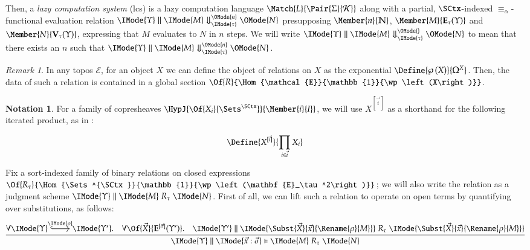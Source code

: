 \documentclass[11pt]{article}
\theoremstyle{definition}
\theoremstyle{notation}
\newtheorem*{notation*}{Notation}
\theoremstyle{remark}
\newtheorem{remark}[thm]{Remark}
\numberwithin{equation}{section}
\newcommand\Pow[1]{\wp\left(#1\right)}
\newcommand\EvalN[5]{\IMode{#1}\parallel\IMode{#4}\Downarrow^{\OMode{#3}}_{\IMode{#2}}\OMode{#5}}
\newcommand\Eval[4]{\EvalN{#1}{#2}{}{#3}{#4}}
\newcommand\Exprs{\mathbf{E}}
\newcommand\Values{\mathbf{V}}
\newcommand\Naturals{\mathbb{N}}
\begin{document}
Then, a \emph{lazy computation system} (lcs) is a lazy computation language
$\Match{L}{\Pair{\Sigma}{\CanOperators}}$ along with a partial, $\SCtx$-indexed
$\equiv_\alpha$-functional evaluation relation
$\EvalN{\Upsilon}{\tau}{n}{M}{N}$ presupposing $\Member{n}{\Naturals}$,
$\Member{M}{\Exprs_\tau(\Upsilon)}$ and $\Member{N}{\Values_\tau(\Upsilon)}$,
expressing that $M$ evaluates to $N$ in $n$ steps.  We will write
$\Eval{\Upsilon}{\tau}{M}{N}$ to mean that there exists an $n$ such that
$\EvalN{\Upsilon}{\tau}{n}{M}{N}$.

\begin{remark}
  In any topos $\mathcal{E}$, for an object $X$ we can define the object of
  relations on $X$ as the exponential $\Define{\Pow{X}}{\Omega^X}$. Then, the
  data of such a relation is contained in a global section
  $\Of{R}{\Hom{\mathcal{E}}{\mathbb{1}}{\Pow{X}}}$.
\end{remark}

\newcommand\SBinRel[4]{\IMode{#2}\parallel\IMode{#3}\mathrel{#1}\IMode{#4}}
\newcommand\OSBinRel[5]{\IMode{#2}\parallel\IMode{#3}\vDash\IMode{#4}\mathrel{#1}\IMode{#5}}

\begin{notation*}
  For a family of copresheaves $\HypJ{\Of{X_i}{\Sets^\SCtx}}{\Member{i}{I}}$, we will
  use $X^{[\vec{i}]}$ as a shorthand for the following iterated product, as
  in \cite{sterling-morrison:2015}:

  \[
    \Define{
      X^{[\vec{i}]}
    }{
      \prod_{i\in\vec{i}}
        X_i
    }
  \]
\end{notation*}

Fix a sort-indexed family of binary relations on closed expressions
$\Of{R_\tau}{\Hom{\Sets^{\SCtx}}{\mathbb{1}}{\Pow{\Exprs_\tau^2}}}$; we will
also write the relation as a judgment scheme
$\SBinRel{R_\tau}{\Upsilon}{M}{N}$. First of all, we can lift such a relation
to operate on open terms by quantifying over substitutions, as follows:
\[
  \infer{
    \OSBinRel{R_\tau}{\Upsilon}{\vec{x}:\vec{\sigma}}{M}{N}
  }{
    \forall
      \begin{tikzcd}[cramped, ampersand replacement = \&]
         \IMode{\Upsilon} \arrow[r,hook,"\IMode{\rho}"] \&\IMode{\Upsilon'}
      \end{tikzcd}.
    \quad
    \forall \Of{\vec{X}}{\Exprs^{[\vec{\sigma}]}(\Upsilon')}.
    \quad
    \SBinRel{R_\tau}{\Upsilon'}{
      \Subst{\vec{X}}{\vec{x}}{\Rename{\rho}{M}}
    }{
      \Subst{\vec{X}}{\vec{x}}{\Rename{\rho}{M}}
    }
  }
\]
\end{document}
